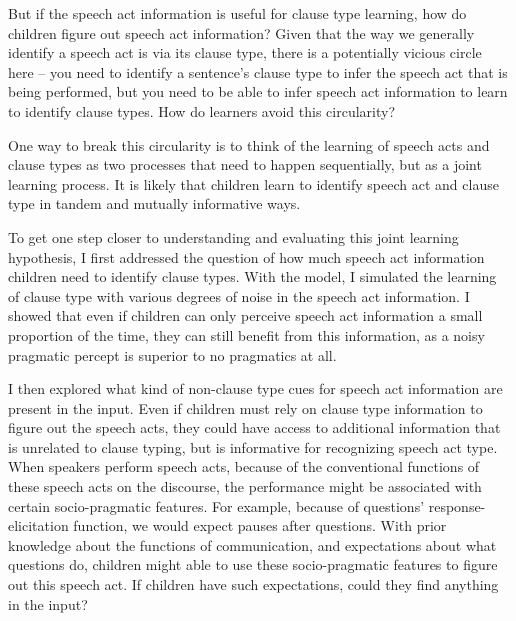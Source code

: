 But if the speech act information is useful for clause type learning, how do children figure out speech act information? Given that the way we generally identify a speech act is via its clause type, there is a potentially vicious circle here -- you need to identify a sentence's clause type to infer the speech act that is being performed, but you need to be able to infer speech act information to learn to identify clause types. How do learners avoid this circularity?

One way to break this circularity is to  think of the learning of speech acts and clause types as two processes that need to happen sequentially, but as a joint learning process. It is likely that children learn to identify speech act and clause type in tandem and mutually informative ways.

To get one step closer to understanding and evaluating this joint learning hypothesis, I first addressed the question of how much speech act information children need to identify clause types. With the \plearnerabbr{} model, I simulated the learning of clause type with various degrees of noise in the speech act information. I showed that even if children can only perceive speech act information a small proportion of the time, they can still benefit from this information, as a noisy pragmatic percept is superior to no pragmatics at all. 

I then explored what kind of non-clause type cues for speech act information are present in the input. Even if children must rely on clause type information to figure out the speech acts, they could have access to additional information that is unrelated to clause typing, but is informative for recognizing speech act type. When speakers perform speech acts, because of the conventional functions of these speech acts on the discourse, the performance might be associated with certain socio-pragmatic features. For example, because of questions' response-elicitation function, we would expect pauses after questions. With prior knowledge about the functions of communication, and expectations about what questions do, children might able to use these socio-pragmatic features to figure out this speech act. If children have such expectations, could they find anything in the input? 

